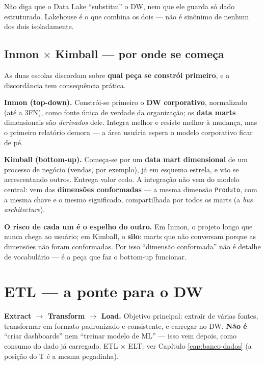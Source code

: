 \begin{pegadinha}
Não diga que o Data Lake ``substitui'' o DW, nem que ele guarda só dado
estruturado. Lakehouse é o que combina os dois --- não é sinônimo de nenhum
dos dois isoladamente.
\end{pegadinha}

\subsection{Inmon $\times$ Kimball --- por onde se começa}

As duas escolas discordam sobre \textbf{qual peça se constrói primeiro}, e a
discordância tem consequência prática.

\begin{conceito}
\textbf{Inmon (top-down).} Constrói-se primeiro o \textbf{DW corporativo},
normalizado (até a 3FN), como fonte única de verdade da organização; os
\textbf{data marts} dimensionais são \emph{derivados} dele. Integra melhor e
resiste melhor à mudança, mas o primeiro relatório demora --- a área usuária
espera o modelo corporativo ficar de pé.

\textbf{Kimball (bottom-up).} Começa-se por um \textbf{data mart dimensional}
de um processo de negócio (vendas, por exemplo), já em esquema estrela, e vão
se acrescentando outros. Entrega valor cedo. A integração não vem do modelo
central: vem das \textbf{dimensões conformadas} --- a mesma dimensão
\texttt{Produto}, com a mesma chave e o mesmo significado, compartilhada por
todos os marts (a \emph{bus architecture}).

\textbf{O risco de cada um é o espelho do outro.} Em Inmon, o projeto longo que
nunca chega ao usuário; em Kimball, o \textbf{silo}: marts que não conversam
porque as dimensões não foram conformadas. Por isso ``dimensão conformada''
não é detalhe de vocabulário --- é a peça que faz o bottom-up funcionar.
\end{conceito}

\section{ETL --- a ponte para o DW}

\textbf{Extract $\to$ Transform $\to$ Load.} Objetivo principal: extrair de
várias fontes, transformar em formato padronizado e consistente, e carregar
no DW. \textbf{Não é} ``criar dashboards'' nem ``treinar modelo de ML'' ---
isso vem depois, como consumo do dado já carregado. ETL $\times$ ELT: ver
Capítulo \ref{cap:banco-dados} (a posição do T é a mesma pegadinha).


